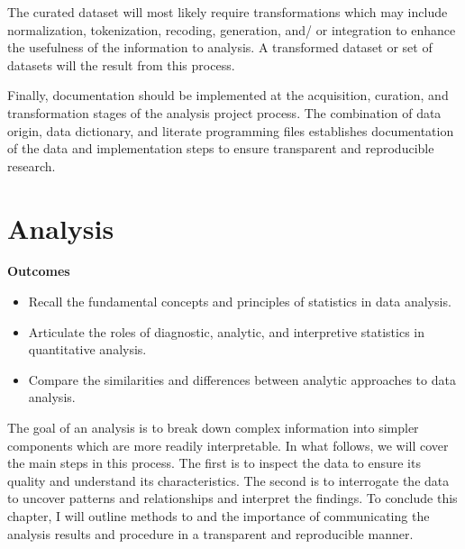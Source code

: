 \documentclass[
  letterpaper,
]{book}
\providecommand{\tightlist}{%
  \setlength{\itemsep}{0pt}\setlength{\parskip}{0pt}}\usepackage{longtable,booktabs,array}
\theoremstyle{definition}
\theoremstyle{remark}
\begin{document}
The curated dataset will most likely require transformations which may
include normalization, tokenization, recoding, generation, and/ or
integration to enhance the usefulness of the information to analysis. A
transformed dataset or set of datasets will the result from this
process.

Finally, documentation should be implemented at the acquisition,
curation, and transformation stages of the analysis project process. The
combination of data origin, data dictionary, and literate programming
files establishes documentation of the data and implementation steps to
ensure transparent and reproducible research.

\chapter{Analysis}\label{sec-analysis-chapter}

\begin{tcolorbox}[enhanced jigsaw, breakable, colframe=quarto-callout-color-frame, toprule=.15mm, arc=.35mm, colback=white, left=2mm, bottomrule=.15mm, rightrule=.15mm, opacityback=0, leftrule=.75mm]

\textbf{ Outcomes}

\begin{itemize}
\tightlist
\item
  Recall the fundamental concepts and principles of statistics in data
  analysis.
\item
  Articulate the roles of diagnostic, analytic, and interpretive
  statistics in quantitative analysis.
\item
  Compare the similarities and differences between analytic approaches
  to data analysis.
\end{itemize}

\end{tcolorbox}

The goal of an analysis is to break down complex information into
simpler components which are more readily interpretable. In what
follows, we will cover the main steps in this process. The first is to
inspect the data to ensure its quality and understand its
characteristics. The second is to interrogate the data to uncover
patterns and relationships and interpret the findings. To conclude this
chapter, I will outline methods to and the importance of communicating
the analysis results and procedure in a transparent and reproducible
manner.
\end{document}
